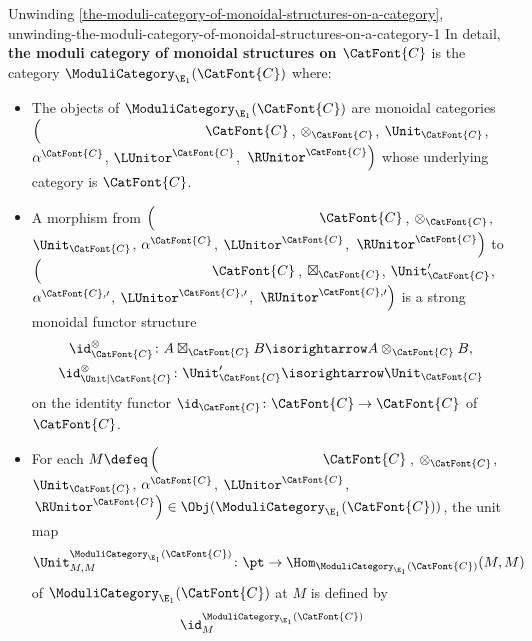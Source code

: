 \begin{remark}{Unwinding \cref{the-moduli-category-of-monoidal-structures-on-a-category}, \rmI}{unwinding-the-moduli-category-of-monoidal-structures-on-a-category-1}%
    In detail, \textbf{the moduli category of monoidal structures on $\CatFont{C}$} is the category $\ModuliCategory_{\E_{1}}(\CatFont{C})$ where:
    \begin{itemize}
        \item{}The objects of $\ModuliCategory_{\E_{1}}(\CatFont{C})$ are monoidal categories $\left(\phantom{\mrp{\LUnitor^{\CatFont{C}}}}\CatFont{C}\right.$, $\otimes_{\CatFont{C}}$, $\Unit_{\CatFont{C}}$, $\alpha^{\CatFont{C}}$, $\LUnitor^{\CatFont{C}}$, $\left.\RUnitor^{\CatFont{C}}\right)$ whose underlying category is $\CatFont{C}$.
        \item{}A morphism from $\left(\phantom{\mrp{\LUnitor^{\CatFont{C}}}}\CatFont{C}\right.$, $\otimes_{\CatFont{C}}$, $\Unit_{\CatFont{C}}$, $\alpha^{\CatFont{C}}$, $\LUnitor^{\CatFont{C}}$, $\left.\RUnitor^{\CatFont{C}}\right)$ to $\left(\phantom{\mrp{\LUnitor^{\CatFont{C},\prime}}}\CatFont{C}\right.$, $\boxtimes_{\CatFont{C}}$, $\Unit'_{\CatFont{C}}$, $\alpha^{\CatFont{C},\prime}$, $\LUnitor^{\CatFont{C},\prime}$, $\left.\RUnitor^{\CatFont{C},\prime}\right)$ is a strong monoidal functor structure%
            \begin{gather*}
                \id^{\otimes}_{\CatFont{C}}       \colon A\boxtimes_{\CatFont{C}}B \isorightarrow A\otimes_{\CatFont{C}}B,\\
                \id^{\otimes}_{\Unit|\CatFont{C}} \colon \Unit'_{\CatFont{C}}      \isorightarrow \Unit_{\CatFont{C}}
            \end{gather*}
            on the identity functor $\id_{\CatFont{C}}\colon\CatFont{C}\to\CatFont{C}$ of $\CatFont{C}$.
        \item{}For each $M\defeq\left(\phantom{\mrp{\LUnitor^{\CatFont{C}}}}\CatFont{C}\right.$, $\otimes_{\CatFont{C}}$, $\Unit_{\CatFont{C}}$, $\alpha^{\CatFont{C}}$, $\LUnitor^{\CatFont{C}}$, $\left.\RUnitor^{\CatFont{C}}\right)\in\Obj(\ModuliCategory_{\E_{1}}(\CatFont{C}))$, the unit map
            \[
                \Unit^{\ModuliCategory_{\E_{1}}(\CatFont{C})}_{M,M}
                \colon%
                \pt%
                \to
                \Hom_{\ModuliCategory_{\E_{1}}(\CatFont{C})}(M,M)
            \]%
            of $\ModuliCategory_{\E_{1}}(\CatFont{C})$ at $M$ is defined by
            \[
                \id^{\ModuliCategory_{\E_{1}}(\CatFont{C})}_{M}%
\]
\end{itemize}
\end{remark}
